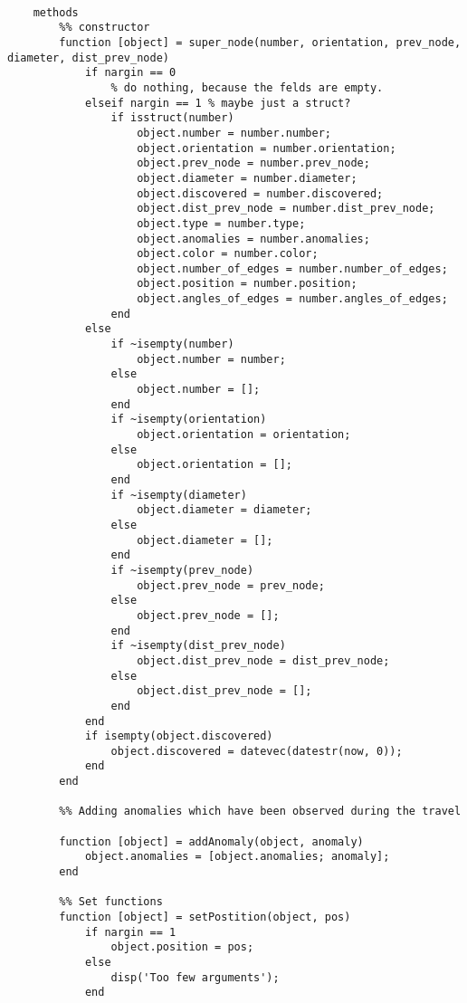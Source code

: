 \begin{lstlisting}
    
    methods
        %% constructor
        function [object] = super_node(number, orientation, prev_node, diameter, dist_prev_node)
            if nargin == 0 
                % do nothing, because the felds are empty.
            elseif nargin == 1 % maybe just a struct?
                if isstruct(number)
                    object.number = number.number;
                    object.orientation = number.orientation;
                    object.prev_node = number.prev_node;
                    object.diameter = number.diameter;
                    object.discovered = number.discovered;
                    object.dist_prev_node = number.dist_prev_node;
                    object.type = number.type;
                    object.anomalies = number.anomalies;
                    object.color = number.color;
                    object.number_of_edges = number.number_of_edges;
                    object.position = number.position;
                    object.angles_of_edges = number.angles_of_edges;
                end
            else
                if ~isempty(number)
                    object.number = number;
                else
                    object.number = [];
                end
                if ~isempty(orientation)
                    object.orientation = orientation;
                else
                    object.orientation = [];
                end
                if ~isempty(diameter)
                    object.diameter = diameter;
                else
                    object.diameter = [];
                end
                if ~isempty(prev_node)
                    object.prev_node = prev_node;
                else
                    object.prev_node = [];
                end
                if ~isempty(dist_prev_node)
                    object.dist_prev_node = dist_prev_node;
                else
                    object.dist_prev_node = [];
                end
            end 
            if isempty(object.discovered)
                object.discovered = datevec(datestr(now, 0));
            end
        end
        
        %% Adding anomalies which have been observed during the travel
        
        function [object] = addAnomaly(object, anomaly)
            object.anomalies = [object.anomalies; anomaly];
        end
        
        %% Set functions
        function [object] = setPostition(object, pos)
            if nargin == 1
                object.position = pos;
            else
                disp('Too few arguments');
            end
            

\end{lstlisting}
